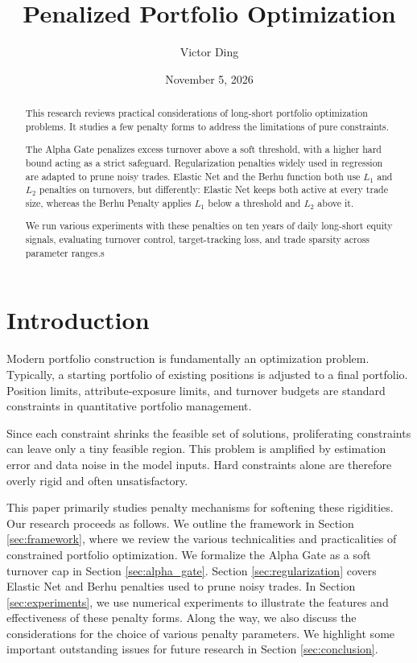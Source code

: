 \documentclass[11pt, letterpaper]{article}
\title{Penalized Portfolio Optimization}
\author{Victor Ding}
\affil{New Canaan High School}
\date{November 5, 2026}
\begin{document}
\maketitle
\thispagestyle{empty}
\newpage

\begin{abstract}
  \thispagestyle{empty}
  \noindent
This research reviews practical considerations of long-short portfolio optimization problems. It studies a few penalty forms to
address the limitations of pure constraints.

The Alpha Gate penalizes excess turnover above a soft threshold, with a higher hard bound acting as a strict
safeguard. Regularization penalties widely used in regression are adapted to prune noisy trades. Elastic Net and the Berhu
function both use \(L_1\) and \(L_2\) penalties on turnovers, but differently: Elastic Net keeps both active at every trade
size, whereas the Berhu Penalty applies \(L_1\) below a threshold and \(L_2\) above it.

We run various experiments with these penalties on ten years of daily long-short equity signals, evaluating turnover control,
target-tracking loss, and trade sparsity across parameter ranges.s
\end{abstract}

\newpage
\pagestyle{myright}
\setcounter{page}{1}

\section{Introduction}
Modern portfolio construction is fundamentally an optimization problem. Typically, a starting portfolio of existing positions is
adjusted to a final portfolio. Position limits, attribute-exposure limits, and turnover budgets are standard constraints in
quantitative portfolio management.

Since each constraint shrinks the feasible set of solutions, proliferating constraints can leave only a tiny feasible
region. This problem is amplified by estimation error and data noise in the model inputs. Hard constraints alone are therefore
overly rigid and often unsatisfactory.

This paper primarily studies penalty mechanisms for softening these rigidities. Our research proceeds as follows. We outline the
framework in Section \ref{sec:framework}, where we review the various technicalities and practicalities of
constrained portfolio optimization. We formalize the Alpha Gate as a soft turnover cap in Section \ref{sec:alpha_gate}.  Section
\ref{sec:regularization} covers Elastic Net and Berhu penalties used to prune noisy trades. In Section \ref{sec:experiments},
we use numerical experiments to illustrate the features and effectiveness of these penalty forms. Along the way, we
also discuss the considerations for the choice of various penalty parameters. We highlight some important outstanding issues for
future research in Section \ref{sec:conclusion}.
\end{document}
